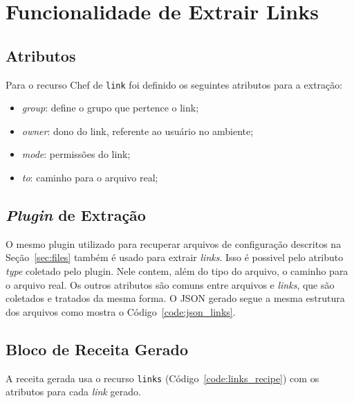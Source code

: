 \section{Funcionalidade de Extrair Links}
\label{sec:links}

\subsection{Atributos}
Para o recurso Chef de \texttt{link} foi definido os seguintes
atributos para a extração:

\begin{itemize}
  \item \textit{group}: define o grupo que pertence o link;
  \item \textit{owner}: dono do link, referente ao usuário no ambiente;
  \item \textit{mode}: permissões do link;
  \item \textit{to}: caminho para o arquivo real;
\end{itemize}

\subsection{\textit{Plugin} de Extração}

O mesmo plugin utilizado para recuperar arquivos de configuração descritos
na Seção~\ref{sec:files} também é usado para extrair \textit{links}. Isso é possivel
pelo atributo \textit{type} coletado pelo plugin. Nele contem, além do tipo do arquivo,
o caminho para o arquivo real. Os outros atributos são comuns entre arquivos e
\textit{links}, que são coletados e tratados da mesma forma. O JSON gerado segue a
mesma estrutura dos arquivos como mostra o Código~\ref{code:json_links}.

\noindent\begin{minipage}{\textwidth}
  \lstset{style=shell}
  
\end{minipage}\hfill

\subsection{Bloco de Receita Gerado}

A receita gerada usa o recurso \texttt{links} (Código~\ref{code:links_recipe}) com os
atributos para cada \textit{link} gerado.

